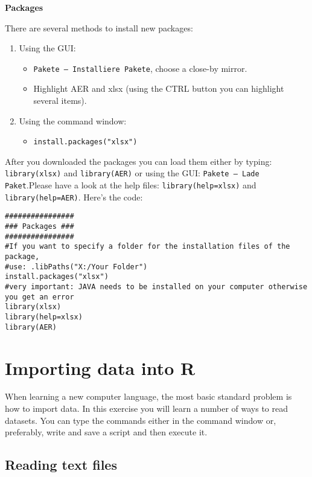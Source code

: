 \documentclass{article}
\begin{document}
\begin{solution}
\textbf{Packages}

There are several methods to install new packages:
\begin{enumerate}
  \item Using the GUI:
    \begin{itemize}
     \item \texttt{Pakete -- Installiere Pakete}, choose a close-by mirror.
     \item Highlight AER and xlsx (using the CTRL button you can highlight several items).
     \end{itemize}
  \item Using the command window:
     \begin{itemize}
       \item \texttt{install.packages("xlsx")}
     \end{itemize}
\end{enumerate}
     After you downloaded the packages you can load them either by typing: \newline \texttt{library(xlsx)} and \texttt{library(AER)} or using the GUI: \texttt{Pakete -- Lade Paket}.\newline Please have a look at the help files: \texttt{library(help=xlsx)} and \texttt{library(help=AER)}. Here's the code:
\begin{verbatim}
################
### Packages ###
################
#If you want to specify a folder for the installation files of the package,
#use: .libPaths("X:/Your Folder")
install.packages("xlsx")
#very important: JAVA needs to be installed on your computer otherwise you get an error
library(xlsx)
library(help=xlsx)
library(AER)
\end{verbatim}
\end{solution}

\section{Importing data into R\label{importingdata}}

When learning a new computer language, the most basic standard problem is how to import data. In this exercise you
will learn a number of ways to read datasets. You can type the commands either in the command window or, preferably, write and save a script and
then execute it.

\subsection{Reading text files}
\end{document}
